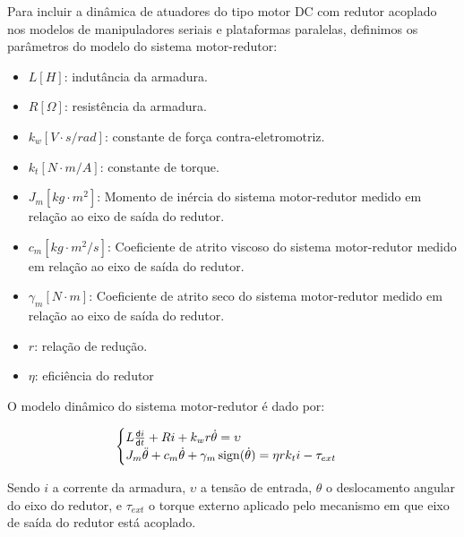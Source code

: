 \documentclass[a4paper,11pt,brazil,fleqn]{article}
\begin{document}

Para incluir a din\^amica de atuadores do tipo motor DC com redutor acoplado nos modelos de manipuladores seriais e plataformas paralelas, definimos os par\^ametros do modelo do sistema motor-redutor:

\begin{itemize}
\item $L [H]$: indut\^ancia da armadura.
\item $R [\Omega]$: resist\^encia da armadura.
\item $k_w [V \cdot s / rad]$: constante de for\c{c}a contra-eletromotriz.
\item $k_t[N \cdot m / A]$: constante de torque.
\item $J_m [kg \cdot m^2]$: Momento de in\'ercia do sistema motor-redutor medido em rela\c{c}\~ao ao eixo de sa\'ida do redutor.
\item $c_m [kg \cdot m^2/s]$: Coeficiente de atrito viscoso do sistema motor-redutor medido em rela\c{c}\~ao ao eixo de sa\'ida do redutor.
\item $\gamma_m [N \cdot m]$: Coeficiente de atrito seco do sistema motor-redutor medido em rela\c{c}\~ao ao eixo de sa\'ida do redutor.
\item $r$: rela\c{c}\~ao de redu\c{c}\~ao.
\item $\eta$: efici\^encia do redutor
\end{itemize}

O modelo din\^amico do sistema motor-redutor \'e dado por:

\begin{equation} \label{eq:Motor}
\begin{cases}
L \frac{\mathsf{d} i}{\mathsf{d} t} + R i + k_w r \dot{\theta} = \upsilon \\
J_m \ddot{\theta} + c_m \dot{\theta} + \gamma_m \operatorname*{sign}(\dot{\theta}) = \eta r k_t i - \tau_{ext}
\end{cases}
\end{equation}

Sendo $i$ a corrente da armadura, $\upsilon$ a tens\~ao de entrada, $\theta$ o deslocamento angular do eixo do redutor, e $\tau_{ext}$ o torque externo aplicado pelo mecanismo em que eixo de sa\'ida do redutor est\'a acoplado. \\
\end{document}
